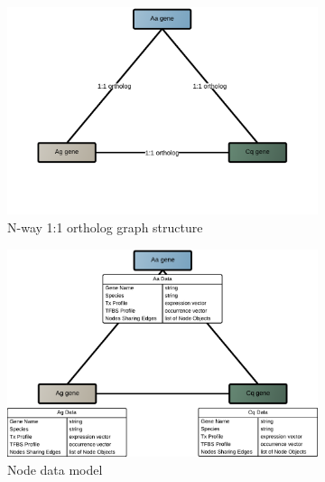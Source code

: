 
\begin{figure}[hp]
\centering
% 
    \begin{subfigure}[t]{.5\linewidth}
    \centering
    \includegraphics[width=\linewidth]{figures/figs/gfunc_graph_figs/ortho-graph-model.pdf}
    \caption{N-way 1:1 ortholog graph structure}\label{fig:nway-ortholog-graph-model}
    \end{subfigure}%
% 
% 
% 
    \begin{subfigure}[t]{.5\linewidth}
    \centering
    \includegraphics[width=\linewidth]{figures/figs/gfunc_graph_figs/ortho-graph-node-data.pdf}
    \caption{Node data model}\label{fig:nway-ortholog-graph-node-data}
    \end{subfigure}
% 
% 
% 
% 
% 
% 
    \begin{subfigure}[t]{.5\linewidth}
    \centering

\end{subfigure}
\end{figure}
